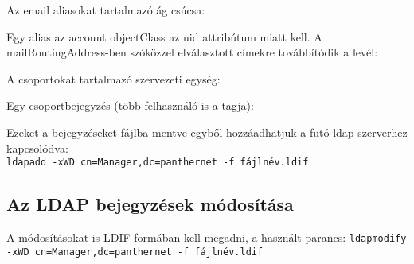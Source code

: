 Az email aliasokat tartalmazó ág csúcsa:


Egy alias az account objectClass az uid attribútum miatt kell. A mailRoutingAddress-ben szóközzel elválasztott címekre
továbbítódik a levél:


A csoportokat tartalmazó szervezeti egység:


Egy csoportbejegyzés (több felhasználó is a tagja):



Ezeket a bejegyzéseket fájlba mentve egyből hozzáadhatjuk a futó ldap szerverhez kapcsolódva:\\
\texttt{ldapadd -xWD cn=Manager,dc=panthernet -f fájlnév.ldif}



\subsection{Az LDAP bejegyzések módosítása}

A módosításokat is LDIF formában kell megadni, a használt parancs:
\texttt{ldapmodify -xWD cn=Manager,dc=panthernet -f fájlnév.ldif}

